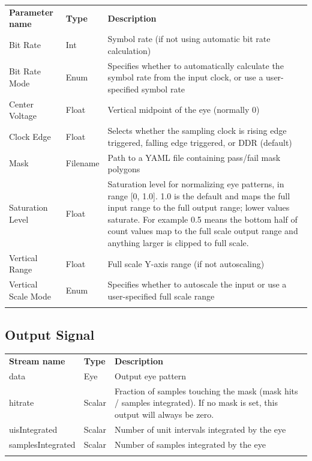 \begin{tabularx}{16cm}{llX}
\thickhline
\textbf{Parameter name} & \textbf{Type} & \textbf{Description} \\
\thickhline
Bit Rate & Int & Symbol rate (if not using automatic bit rate calculation)\\
\thinhline
Bit Rate Mode & Enum & Specifies whether to automatically calculate the symbol rate from the input clock,
or use a user-specified symbol rate \\
\thinhline
Center Voltage & Float & Vertical midpoint of the eye (normally 0)\\
\thinhline
Clock Edge & Float & Selects whether the sampling clock is rising edge triggered, falling edge triggered, or DDR
(default)\\
\thinhline
Mask & Filename & Path to a YAML file containing pass/fail mask polygons\\
\thinhline
Saturation Level & Float & Saturation level for normalizing eye patterns, in range [0, 1.0]. 1.0 is the default and
maps the full input range to the full output range; lower values saturate. For example 0.5 means the bottom half
of count values map to the full scale output range and anything larger is clipped to full scale. \\
\thinhline
Vertical Range & Float & Full scale Y-axis range (if not autoscaling) \\
\thinhline
Vertical Scale Mode & Enum & Specifies whether to autoscale the input or use a user-specified full scale range\\
\thickhline
\end{tabularx}

\subsection{Output Signal}

\begin{tabularx}{16cm}{llX}
\thickhline
\textbf{Stream name} & \textbf{Type} & \textbf{Description} \\
\thickhline
data & Eye & Output eye pattern \\
\thinhline
hitrate & Scalar & Fraction of samples touching the mask (mask hits / samples integrated). If no mask is set, this
output will always be zero.\\
\thinhline
uisIntegrated & Scalar & Number of unit intervals integrated by the eye \\
\thinhline
samplesIntegrated & Scalar & Number of samples integrated by the eye \\
\thickhline
\end{tabularx}

